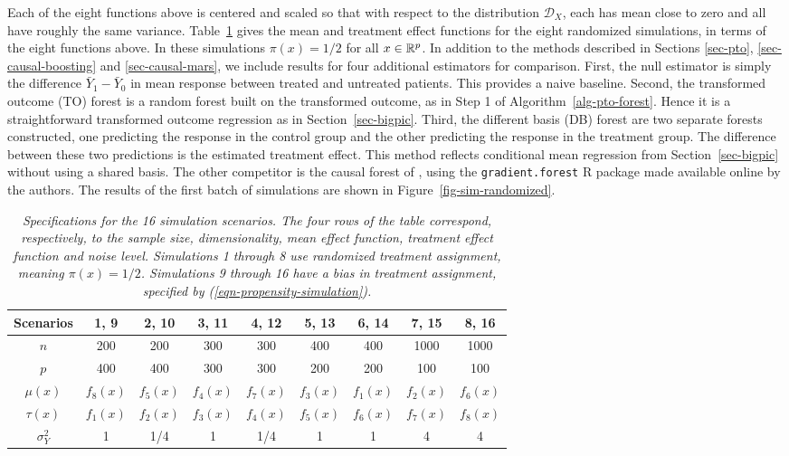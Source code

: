 \documentclass{article}
\def\D{\mathcal{D}}\def\F{\mathcal{F}}\def\K{\mathcal{K}}\def\N{\mathcal{N}}
\begin{document}
Each of the eight functions above is centered and scaled so that with respect
to the distribution $\D_X$, each has mean close to zero and all have roughly
the same variance. Table~\ref{tab-sim-randomized} gives the mean and treatment
effect functions for the eight randomized simulations, in terms of the eight
functions above. In these simulations $\pi(x) = 1/2$ for all $x \in \mathbb{R}^p$.
In addition to the methods described in Sections \ref{sec-pto},
\ref{sec-causal-boosting} and \ref{sec-causal-mars}, we include results for
four additional estimators for comparison. First, the null estimator is simply
the difference $\bar Y_1 - \bar Y_0$ in mean response between treated and
untreated patients. This provides a naive baseline.
Second, the transformed outcome (TO) forest is a random forest built on the
transformed outcome, as in Step 1 of Algorithm~\ref{alg-pto-forest}. Hence it
is a straightforward transformed outcome regression as in
Section~\ref{sec-bigpic}. Third,
the different basis (DB) forest are two separate forests constructed, one
predicting the response in the control group and the other predicting the
response in the treatment group. The difference between these two predictions
is the estimated treatment effect. This method reflects conditional mean
regression from Section~\ref{sec-bigpic} without using a shared basis.
The other competitor is
the causal forest of \cite{Athey-etal17}, using the
{\tt gradient.forest} R
package made available online by the authors. The results of the first batch of
simulations are shown in Figure~\ref{fig-sim-randomized}.

\begin{table}
\caption{\it Specifications for the 16 simulation scenarios.
  The four rows of the table correspond, respectively, to the sample
  size, dimensionality, mean effect function, treatment effect function and
  noise level. Simulations 1 through 8 use randomized treatment assignment,
  meaning $\pi(x) = 1/2$. Simulations 9 through 16 have a bias in treatment
  assignment, specified by (\ref{eqn-propensity-simulation}).}
\label{tab-sim-randomized}
\centering
\begin{tabular}{c|cccccccc}
Scenarios  & 1, 9 & 2, 10 & 3, 11 & 4, 12 & 5, 13 & 6, 14 & 7, 15 & 8, 16\\
\hline
$n$ & 200 & 200 & 300 & 300 & 400 & 400 & 1000 & 1000\\
$p$ & 400 & 400 & 300 & 300 & 200 & 200 & 100 & 100\\
$\mu(x)$  & $f_8(x)$ & $f_5(x)$ & $f_4(x)$ & $f_7(x)$ & $f_3(x)$ & $f_1(x)$ &
  $f_2(x)$ & $f_6(x)$\\
$\tau(x)$ & $f_1(x)$ & $f_2(x)$ & $f_3(x)$ & $f_4(x)$ & $f_5(x)$ & $f_6(x)$ &
  $f_7(x)$ & $f_8(x)$\\
$\sigma^2_Y$ & 1 & 1/4 & 1 & 1/4 & 1 & 1 & 4 & 4
\end{tabular}
\end{table}
\end{document}
